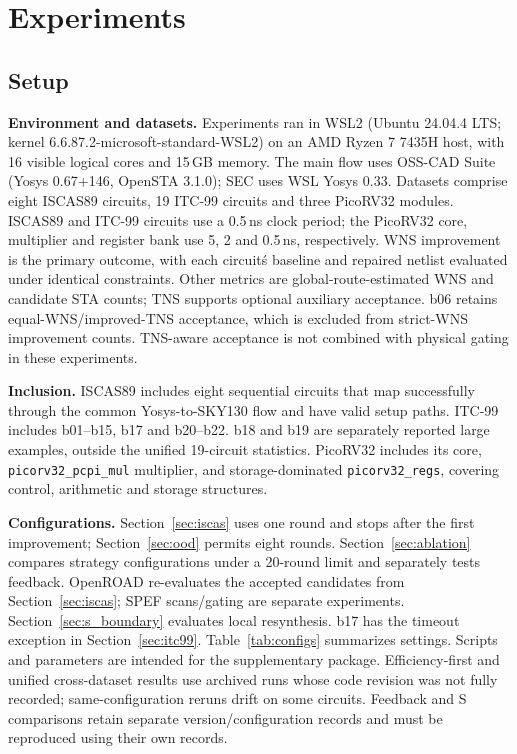 \documentclass[preprint,12pt]{elsarticle}
\begin{document}
\section{Experiments}\label{sec:exp}
\subsection{Setup}\label{sec:setup}
\textbf{Environment and datasets.} Experiments ran in WSL2 (Ubuntu 24.04.4 LTS; kernel 6.6.87.2-microsoft-standard-WSL2) on an AMD Ryzen 7 7435H host, with 16 visible logical cores and 15\,GB memory. The main flow uses OSS-CAD Suite (Yosys 0.67+146, OpenSTA 3.1.0); SEC uses WSL Yosys 0.33. Datasets comprise eight ISCAS89 circuits, 19 ITC-99 circuits and three PicoRV32 modules. ISCAS89 and ITC-99 circuits use a 0.5\,ns clock period; the PicoRV32 core, multiplier and register bank use 5, 2 and 0.5\,ns, respectively. WNS improvement is the primary outcome, with each circuit\'s baseline and repaired netlist evaluated under identical constraints. Other metrics are global-route-estimated WNS and candidate STA counts; TNS supports optional auxiliary acceptance. b06 retains equal-WNS/improved-TNS acceptance, which is excluded from strict-WNS improvement counts. TNS-aware acceptance is not combined with physical gating in these experiments.

\textbf{Inclusion.} ISCAS89 includes eight sequential circuits that map successfully through the common Yosys-to-SKY130 flow and have valid setup paths. ITC-99 includes b01--b15, b17 and b20--b22. b18 and b19 are separately reported large examples, outside the unified 19-circuit statistics. PicoRV32 includes its core, \texttt{picorv32\_pcpi\_mul} multiplier, and storage-dominated \texttt{picorv32\_regs}, covering control, arithmetic and storage structures.

\textbf{Configurations.} Section~\ref{sec:iscas} uses one round and stops after the first improvement; Section~\ref{sec:ood} permits eight rounds. Section~\ref{sec:ablation} compares strategy configurations under a 20-round limit and separately tests feedback. OpenROAD re-evaluates the accepted candidates from Section~\ref{sec:iscas}; SPEF scans/gating are separate experiments. Section~\ref{sec:s_boundary} evaluates local resynthesis. b17 has the timeout exception in Section~\ref{sec:itc99}. Table~\ref{tab:configs} summarizes settings. Scripts and parameters are intended for the supplementary package. Efficiency-first and unified cross-dataset results use archived runs whose code revision was not fully recorded; same-configuration reruns drift on some circuits. Feedback and S comparisons retain separate version/configuration records and must be reproduced using their own records.
\end{document}
